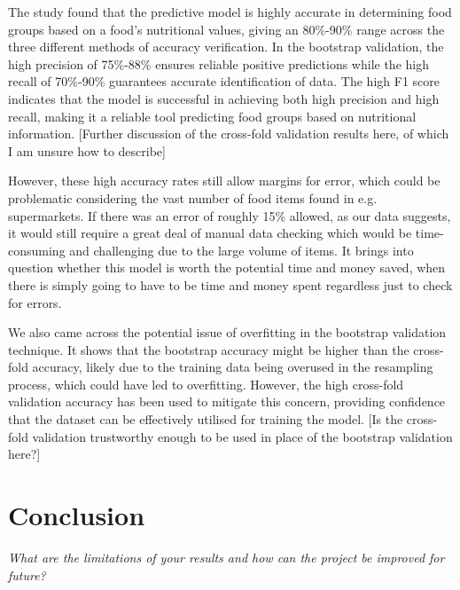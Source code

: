 \documentclass[11pt]{article}
\begin{document}
The study found that the predictive model is highly accurate in determining food groups based on a food’s nutritional values, giving an 80\%-90\% range across the three different methods of accuracy verification. In the bootstrap validation, the high precision of 75\%-88\% ensures reliable positive predictions while the high recall of 70\%-90\% guarantees accurate identification of data. The high F1 score indicates that the model is successful in achieving both high precision and high recall, making it a reliable tool predicting food groups based on nutritional information.
[Further discussion of the cross-fold validation results here, of which I am unsure how to describe]

However, these high accuracy rates still allow margins for error, which could be problematic considering the vast number of food items found in e.g. supermarkets. If there was an error of roughly 15\% allowed, as our data suggests, it would still require a great deal of manual data checking which would be time-consuming and challenging due to the large volume of items. It brings into question whether this model is worth the potential time and money saved, when there is simply going to have to be time and money spent regardless just to check for errors.

We also came across the potential issue of overfitting in the bootstrap validation technique. It shows that the bootstrap accuracy might be higher than the cross-fold accuracy, likely due to the training data being overused in the resampling process, which could have led to overfitting. However, the high cross-fold validation accuracy has been used to mitigate this concern, providing confidence that the dataset can be effectively utilised for training the model.
[Is the cross-fold validation trustworthy enough to be used in place of the bootstrap validation here?]




\section{Conclusion}
\emph{What are the limitations of your results and how can the project be improved for future?}
\end{document}
